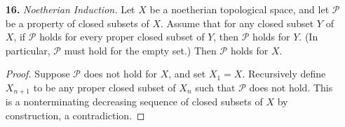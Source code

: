 \documentclass[a4paper]{article}
\begin{document}
\begin{enumerate} [label=\textbf{\arabic*.}, leftmargin=0em]
\begin{proof}
\begin{itemize} [leftmargin=0cm]
                  \item[(f)] By (Ex. 3.3a), it suffices to show $f$ is locally of finite type. Let $W = \spec{C}$ be an open affine subset of $Z$, and let $V_i = \spec{B_i}$ be an open affine cover of $g^{-1}(W)$. By (Ex. 3.3c), for each $i$, we can cover $f^{-1}(V_i)$ by open affines $U_{ij} = \spec{A_{ij}}$ where each $A_{ij}$ is a finitely generated $C$-algebra. We have a composition of structure morphisms $C \to B_i \to A_{ij}$, where $A_{ij}$ is finitely generated over the image of $C$ in $A_{ij}$. Since the image of $C$ in $A_{ij}$ is contained in the image of $B_i$ in $A_{ij}$, $A_{ij}$ is also a finitely generated $B_i$-algebra.

                  \item[(g)] This corresponds to the fact that any finitely generated algebra over a noetherian ring is also noetherian as a ring.
              \end{itemize}
          \end{proof}

    \item[\textbf{16.}] \textit{Noetherian Induction.} Let $X$ be a noetherian topological space, and let $\mathscr{P}$ be a property of closed subsets of $X$. Assume that for any closed subset $Y$ of $X$, if $\mathscr{P}$ holds for every proper closed subset of $Y$, then $\mathscr{P}$ holds for $Y$. (In particular, $\mathscr{P}$ must hold for the empty set.) Then $\mathscr{P}$ holds for $X$.

          \begin{proof}
              Suppose $\mathscr{P}$ does not hold for $X$, and set $X_1 = X$. Recursively define $X_{n + 1}$ to be any proper closed subset of $X_{n}$ such that $\mathscr{P}$ does not hold. This is a nonterminating decreasing sequence of closed subsets of $X$ by construction, a contradiction.
          \end{proof}


\end{enumerate}
\end{document}
